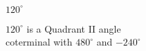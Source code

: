 {$120^{\circ}$}
{$120^{\circ}$ is a Quadrant II angle\\
coterminal with $480^{\circ}$ and $-240^{\circ}$

\begin{center}
\end{center}}
